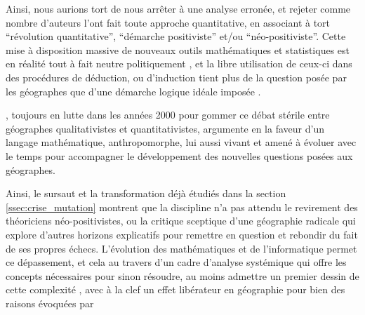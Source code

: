 Ainsi, nous aurions tort de nous arrêter à une analyse erronée, et rejeter comme nombre d'auteurs l'ont fait toute approche quantitative, en associant à tort \enquote{révolution quantitative}, \enquote{démarche positiviste} et/ou \enquote{néo-positiviste}. Cette mise à disposition massive de nouveaux outils mathématiques et statistiques est en réalité tout à fait neutre politiquement \autocite{Sheppard2001}, et la libre utilisation de ceux-ci dans des procédures de déduction, ou d'induction tient plus de la question posée par les géographes que d'une démarche logique idéale imposée \autocite{Sanders2000}. 


\textcite{Sheppard2001}, toujours en lutte dans les années 2000 pour gommer ce débat stérile entre géographes qualitativistes et quantitativistes, argumente en la faveur d'un langage mathématique, anthropomorphe, lui aussi vivant et amené à évoluer avec le temps pour accompagner le développement des nouvelles questions posées aux géographes.


Ainsi, le sursaut et la transformation déjà étudiés dans la section \ref{ssec:crise_mutation} montrent que la discipline n'a pas attendu le revirement des théoriciens néo-positivistes, ou la critique sceptique d'une géographie radicale qui explore d'autres horizons explicatifs pour remettre en question et rebondir du fait de ses propres échecs. L'évolution des mathématiques et de l'informatique permet ce dépassement, et cela au travers d'un cadre d'analyse systémique qui offre les concepts nécessaires pour sinon résoudre, au moins admettre un premier dessin de cette complexité \autocite{Dauphine2003}, avec à la clef un effet libérateur en géographie pour bien des raisons évoquées par \textcites[137]{Pumain2002}[27-28]{Pumain2003}

